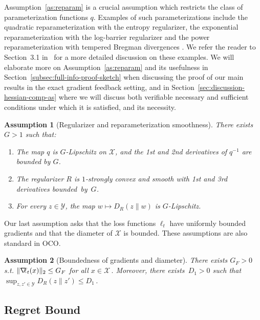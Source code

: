 \documentclass[a4paper,11pt,fullpage]{article}
\def\X{{\mathcal X}}
\def\Y{{\mathcal Y}}
\theoremstyle{plain}
\newtheorem{assumption}{Assumption}
\theoremstyle{definition}
\theoremstyle{plain}
\let\nablaold\nabla
\renewcommand{\nabla}{\nablaold\mkern-2.5mu}
\begin{document}
Assumption~\ref{as:reparam} is a crucial assumption which restricts the class of parameterization functions $q$. 
Examples of such parameterizations include the quadratic reparameterization with the entropy regularizer,  
the exponential reparameterization with the log-barrier regularizer and the power reparameterization with 
tempered Bregman divergences \citep{amid-et-al19robust-bitempered}. 
We refer the reader to Section~3.1 in~\citet{ghai-lu-hazan22} for a more detailed discussion on these examples. 
We will elaborate more on Assumption~\ref{as:reparam} and its usefulness in Section~\ref{subsec:full-info-proof-sketch} when discussing the proof of our main results in the exact gradient feedback setting, and in Section~\ref{sec:discussion-hessian-comp-as} where we will discuss both verifiable necessary and sufficient conditions under which it is satisfied, and its necessity. 

\begin{assumption}[Regularizer and reparameterization smoothness] 
\label{as:reg-R-reparam-q-smoothness}
There exists \(G>1\) such that:
\begin{enumerate}[label=(\roman*),leftmargin=*]
    \item The map \(q\) is \(G\)-Lipschitz on \(\X\), and the 1st and 2nd derivatives of \(q^{-1}\) are bounded by \(G\). 
    \item The regularizer $R$ is $1$-strongly convex and smooth with 1st and 3rd derivatives bounded~by~$G$.
    \item For every \(z\in\Y\), the map \(w\mapsto D_R(z\|w)\) is \(G\)-Lipschitz. 
\end{enumerate}
\end{assumption}

Our last assumption asks that the loss functions $\ell_t$ have uniformly bounded gradients and that the diameter of $\X$ is bounded. 
These assumptions are also standard in OCO. 

\begin{assumption}[Boundedness of gradients and diameter]
\label{as:boundedness-grad-bregman}
There exists $G_F > 0$ s.t. $\|\nabla \ell_t(x)\|_2 \le G_F$ for all $x\in \X\,.$
Moreover, there exists~$D_1 > 0$ such that $\sup_{z,z' \in \Y} D_R(z\| z') \le D_1$\,.
\end{assumption}

\subsection{Regret Bound}
\label{subsec:full-info-reg-bound}
\end{document}
